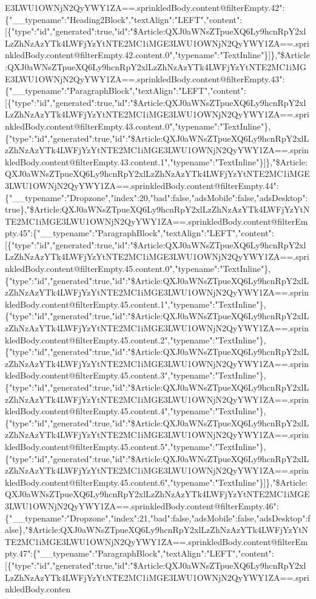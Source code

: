 E3LWU1OWNjN2QyYWY1ZA==.sprinkledBody.content@filterEmpty.42":\{"\_\_typename":"Heading2Block","textAlign":"LEFT","content":{[}\{"type":"id","generated":true,"id":"\$Article:QXJ0aWNsZTpueXQ6Ly9hcnRpY2xlLzZhNzAzYTk4LWFjYzYtNTE2MC1iMGE3LWU1OWNjN2QyYWY1ZA==.sprinkledBody.content@filterEmpty.42.content.0","typename":"TextInline"\}{]}\},"\$Article:QXJ0aWNsZTpueXQ6Ly9hcnRpY2xlLzZhNzAzYTk4LWFjYzYtNTE2MC1iMGE3LWU1OWNjN2QyYWY1ZA==.sprinkledBody.content@filterEmpty.43":\{"\_\_typename":"ParagraphBlock","textAlign":"LEFT","content":{[}\{"type":"id","generated":true,"id":"\$Article:QXJ0aWNsZTpueXQ6Ly9hcnRpY2xlLzZhNzAzYTk4LWFjYzYtNTE2MC1iMGE3LWU1OWNjN2QyYWY1ZA==.sprinkledBody.content@filterEmpty.43.content.0","typename":"TextInline"\},\{"type":"id","generated":true,"id":"\$Article:QXJ0aWNsZTpueXQ6Ly9hcnRpY2xlLzZhNzAzYTk4LWFjYzYtNTE2MC1iMGE3LWU1OWNjN2QyYWY1ZA==.sprinkledBody.content@filterEmpty.43.content.1","typename":"TextInline"\}{]}\},"\$Article:QXJ0aWNsZTpueXQ6Ly9hcnRpY2xlLzZhNzAzYTk4LWFjYzYtNTE2MC1iMGE3LWU1OWNjN2QyYWY1ZA==.sprinkledBody.content@filterEmpty.44":\{"\_\_typename":"Dropzone","index":20,"bad":false,"adsMobile":false,"adsDesktop":true\},"\$Article:QXJ0aWNsZTpueXQ6Ly9hcnRpY2xlLzZhNzAzYTk4LWFjYzYtNTE2MC1iMGE3LWU1OWNjN2QyYWY1ZA==.sprinkledBody.content@filterEmpty.45":\{"\_\_typename":"ParagraphBlock","textAlign":"LEFT","content":{[}\{"type":"id","generated":true,"id":"\$Article:QXJ0aWNsZTpueXQ6Ly9hcnRpY2xlLzZhNzAzYTk4LWFjYzYtNTE2MC1iMGE3LWU1OWNjN2QyYWY1ZA==.sprinkledBody.content@filterEmpty.45.content.0","typename":"TextInline"\},\{"type":"id","generated":true,"id":"\$Article:QXJ0aWNsZTpueXQ6Ly9hcnRpY2xlLzZhNzAzYTk4LWFjYzYtNTE2MC1iMGE3LWU1OWNjN2QyYWY1ZA==.sprinkledBody.content@filterEmpty.45.content.1","typename":"TextInline"\},\{"type":"id","generated":true,"id":"\$Article:QXJ0aWNsZTpueXQ6Ly9hcnRpY2xlLzZhNzAzYTk4LWFjYzYtNTE2MC1iMGE3LWU1OWNjN2QyYWY1ZA==.sprinkledBody.content@filterEmpty.45.content.2","typename":"TextInline"\},\{"type":"id","generated":true,"id":"\$Article:QXJ0aWNsZTpueXQ6Ly9hcnRpY2xlLzZhNzAzYTk4LWFjYzYtNTE2MC1iMGE3LWU1OWNjN2QyYWY1ZA==.sprinkledBody.content@filterEmpty.45.content.3","typename":"TextInline"\},\{"type":"id","generated":true,"id":"\$Article:QXJ0aWNsZTpueXQ6Ly9hcnRpY2xlLzZhNzAzYTk4LWFjYzYtNTE2MC1iMGE3LWU1OWNjN2QyYWY1ZA==.sprinkledBody.content@filterEmpty.45.content.4","typename":"TextInline"\},\{"type":"id","generated":true,"id":"\$Article:QXJ0aWNsZTpueXQ6Ly9hcnRpY2xlLzZhNzAzYTk4LWFjYzYtNTE2MC1iMGE3LWU1OWNjN2QyYWY1ZA==.sprinkledBody.content@filterEmpty.45.content.5","typename":"TextInline"\},\{"type":"id","generated":true,"id":"\$Article:QXJ0aWNsZTpueXQ6Ly9hcnRpY2xlLzZhNzAzYTk4LWFjYzYtNTE2MC1iMGE3LWU1OWNjN2QyYWY1ZA==.sprinkledBody.content@filterEmpty.45.content.6","typename":"TextInline"\}{]}\},"\$Article:QXJ0aWNsZTpueXQ6Ly9hcnRpY2xlLzZhNzAzYTk4LWFjYzYtNTE2MC1iMGE3LWU1OWNjN2QyYWY1ZA==.sprinkledBody.content@filterEmpty.46":\{"\_\_typename":"Dropzone","index":21,"bad":false,"adsMobile":false,"adsDesktop":false\},"\$Article:QXJ0aWNsZTpueXQ6Ly9hcnRpY2xlLzZhNzAzYTk4LWFjYzYtNTE2MC1iMGE3LWU1OWNjN2QyYWY1ZA==.sprinkledBody.content@filterEmpty.47":\{"\_\_typename":"ParagraphBlock","textAlign":"LEFT","content":{[}\{"type":"id","generated":true,"id":"\$Article:QXJ0aWNsZTpueXQ6Ly9hcnRpY2xlLzZhNzAzYTk4LWFjYzYtNTE2MC1iMGE3LWU1OWNjN2QyYWY1ZA==.sprinkledBody.conten
